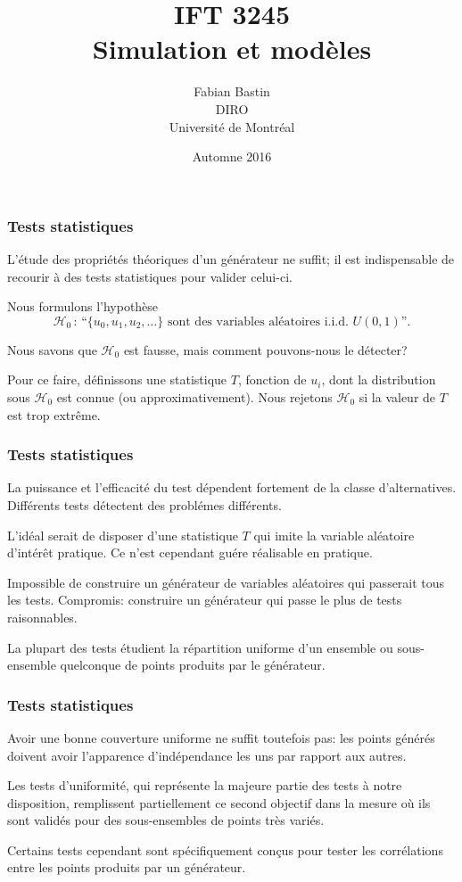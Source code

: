 \documentclass[t,usepdftitle=false]{beamer}
\title[IFT3245]{IFT 3245\\Simulation et modèles}
\author[Fabian Bastin]{Fabian Bastin\\DIRO\\Université de Montréal}
\date{Automne 2016}
\def\cH{\mathcal{H}}
\begin{document}
\frame{\titlepage}

\begin{frame}
\frametitle{Tests statistiques}

L'étude des propriétés théoriques d'un générateur ne suffit;
il est indispensable de recourir à des tests statistiques pour valider celui-ci.

\mbox{}

Nous formulons l'hypothèse
\[
 {\cH_0}\,:\, \mbox{``}\{u_0,u_1,u_2,\dots\} \mbox{ sont des variables aléatoires i.i.d. } U(0,1)\mbox{''}.
\]

\mbox{}

Nous savons que $\cH_0$ est fausse, mais comment pouvons-nous le détecter?

\mbox{}

Pour ce faire, définissons une statistique ${T}$, fonction de $u_i$, dont la distribution
sous $\cH_0$ est connue (ou approximativement).
Nous rejetons $\cH_0$ si la valeur de $T$ est trop extrême.

\end{frame}

\begin{frame}
\frametitle{Tests statistiques}

La puissance et l'efficacité du test dépendent fortement de la classe d'alternatives.
Différents tests détectent des problémes différents.

\mbox{}

L'idéal serait de disposer d'une statistique $T$ qui imite la variable aléatoire d'intérêt pratique.
Ce n'est cependant guére réalisable en pratique.

\mbox{}

Impossible de construire un générateur de variables aléatoires qui passerait tous les tests. Compromis: construire un générateur qui passe le plus de tests
raisonnables.

\mbox{}

La plupart des tests étudient la répartition uniforme d'un ensemble ou sous-ensemble quelconque de points produits par le générateur.

\end{frame}

\begin{frame}
\frametitle{Tests statistiques}

Avoir une bonne couverture uniforme ne suffit toutefois pas: les points générés doivent avoir l'apparence d'indépendance les uns par rapport aux autres.

\mbox{}

Les tests d'uniformité, qui représente la majeure partie des tests à notre disposition, remplissent partiellement ce second objectif dans la mesure où ils sont validés pour des sous-ensembles de points très variés.

\mbox{}

Certains tests cependant sont spécifiquement conçus pour tester les corrélations entre les points produits par un générateur.

\end{frame}
\end{document}
